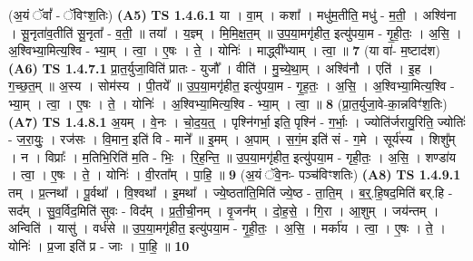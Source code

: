 \documentclass[17pt]{extarticle}
\begin{document}
                  \newline
                      (अ॒यं ॅवां᳚ - ॅविꣳश॒तिः)  \textbf{(A5)} \newline \newline
                                \textbf{ TS 1.4.6.1} \newline
                  या । वा॒म् । कशा᳚ । मधु॑म॒तीति॒ मधु॑ - म॒ती॒ । अश्वि॑ना । सू॒नृता॑व॒तीति॑ सू॒नृता᳚ - व॒ती॒ ॥ तया᳚ । य॒ज्ञ्म् । मि॒मि॒क्ष॒त॒म् ॥ उ॒प॒या॒मगृ॑हीत॒ इत्यु॑पया॒म - गृ॒ही॒तः॒ । अ॒सि॒ । अ॒श्विभ्या॒मित्य॒श्वि - भ्या॒म् । त्वा॒ । ए॒षः । ते॒ । योनिः॑ । माद्ध्वी᳚भ्याम् । त्वा॒ ॥ \textbf{  7 } \newline
                  \newline
                      (या वा॑- म॒ष्टाद॑श)  \textbf{(A6)} \newline \newline
                                \textbf{ TS 1.4.7.1} \newline
                  प्रा॒त॒र्युजा॒विति॑ प्रातः - युजौ᳚ । वीति॑ । मु॒च्ये॒था॒म् । अश्वि॑नौ । एति॑ । इ॒ह । ग॒च्छ॒त॒म् ॥ अ॒स्य । सोम॑स्य । पी॒तये᳚ ॥ उ॒प॒या॒मगृ॑हीत॒ इत्यु॑पया॒म - गृ॒ह॒तः॒ । अ॒सि॒ । अ॒श्विभ्या॒मित्य॒श्वि - भ्या॒म् । त्वा॒ । ए॒षः । ते॒ । योनिः॑ । अ॒श्विभ्या॒मित्य॒श्वि - भ्या॒म् । त्वा॒ ॥ \textbf{  8} \newline
                  \newline
                      (प्रा॒त॒र्युजा॒वे-का॒न्नविꣳ॑श॒तिः)  \textbf{(A7)} \newline \newline
                                \textbf{ TS 1.4.8.1} \newline
                  अ॒यम् । वे॒नः । चो॒द॒य॒त्॒ । पृश्नि॑गर्भा॒ इति॒ पृश्नि॑ - ग॒र्भाः॒ । ज्योति॑र्जरायु॒रिति॒ ज्योतिः॑ - ज॒रा॒युः॒ । रज॑सः । वि॒मान॒ इति॑ वि - माने᳚ ॥ इ॒मम् । अ॒पाम् । स॒गं॒म इति॑ सं - ग॒मे । सूर्य॑स्य । शिशु᳚म् । न । विप्राः᳚ । म॒तिभि॒रिति॑ म॒ति - भिः॒ । रि॒ह॒न्ति॒ ॥ उ॒प॒या॒मगृ॑हीत॒ इत्यु॑पया॒म - गृही॒तः॒ । अ॒सि॒ । शण्डा॑य । त्वा॒ । ए॒षः । ते॒ । योनिः॑ । वी॒रता᳚म् । पा॒हि॒ ॥ \textbf{  9} \newline
                  \newline
                      (अ॒यं ॅवे॒नः- पञ्च॑विꣳशतिः)  \textbf{(A8)} \newline \newline
                                \textbf{ TS 1.4.9.1} \newline
                  तम् । प्र॒त्नथा᳚ । पू॒र्वथा᳚ । वि॒श्वथा᳚ । इ॒मथा᳚ । ज्ये॒ष्ठता॑ति॒मिति॑ ज्ये॒ष्ठ - ता॒ति॒म् । ब॒र्॒.हि॒षद॒मिति॑ बर्.हि - सद᳚म् । सु॒व॒र्विद॒मिति॑ सुवः - विद᳚म् । प्र॒ती॒ची॒नम् । वृ॒जन᳚म् । दो॒ह॒से॒ । गि॒रा । आ॒शुम् । जय॑न्तम् । अन्विति॑ । यासु॑ । वर्ध॑से ॥ उ॒प॒या॒मगृ॑हीत॒ इत्यु॑पया॒म - गृ॒ही॒तः॒ । अ॒सि॒ । मर्का॑य । त्वा॒ । ए॒षः । ते॒ । योनिः॑ । प्र॒जा इति॑ प्र - जाः । पा॒हि॒ ॥ \textbf{  10 } \newline
\end{document}
